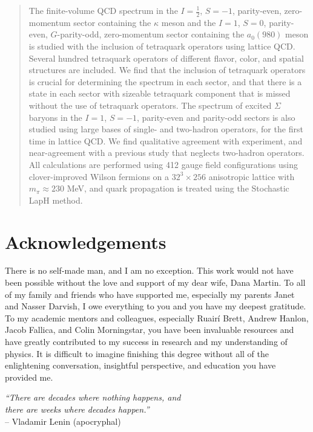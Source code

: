 \documentclass[12pt]{report}
\begin{document}
\onehalfspace


\begin{abstract}
    The finite-volume QCD spectrum in the $I=\frac{1}{2}$, $S=-1$, parity-even, zero-momentum sector containing the $\kappa$ meson and the $I=1$, $S=0$, parity-even, $G$-parity-odd, zero-momentum sector containing the $a_0(980)$ meson is studied with the inclusion of tetraquark operators using lattice QCD. Several hundred tetraquark operators of different flavor, color, and spatial structures are included. We find that the inclusion of tetraquark operators is crucial for determining the spectrum in each sector, and that there is a state in each sector with sizeable tetraquark component that is missed without the use of tetraquark operators. The spectrum of excited $\Sigma$ baryons in the $I=1$, $S=-1$, parity-even and parity-odd sectors is also studied using large bases of single- and two-hadron operators, for the first time in lattice QCD. We find qualitative agreement with experiment, and near-agreement with a previous study that neglects two-hadron operators. All calculations are performed using 412 gauge field configurations using clover-improved Wilson fermions on a $32^3\times 256$ anisotropic lattice with $m_\pi \approx 230$ MeV, and quark propagation is treated using the Stochastic LapH method. 
\end{abstract}

\chapter*{Acknowledgements}
There is no self-made man, and I am no exception. This work would not have been possible without the love and support of my dear wife, Dana Martin. To all of my family and friends who have supported me, especially my parents Janet and Nasser Darvish, I owe everything to you and you have my deepest gratitude. To my academic mentors and colleagues, especially Ruair\'i Brett, Andrew Hanlon, Jacob Fallica, and Colin Morningstar, you have been invaluable resources and have greatly contributed to my success in research and my understanding of physics. It is difficult to imagine finishing this degree without all of the enlightening conversation, insightful perspective, and education you have provided me.
\newpage
\null
\vfill
\begin{flushright}
    \textit{``There are decades where nothing happens, and\\
    there are weeks where decades happen.''}\\
    -- Vladamir Lenin (apocryphal)
\end{flushright}
\vfill
\tableofcontents
\listoffigures
\listoftables
\end{document}
